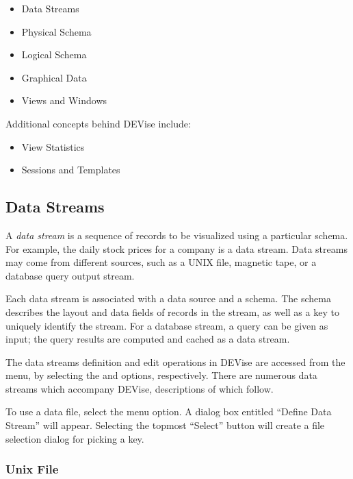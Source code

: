 \begin{itemize}
	\item Data Streams
	\item Physical Schema
	\item Logical Schema
	\item Graphical Data
	\item Views and Windows
\end{itemize}

Additional concepts behind DEVise include:

\begin{itemize}
	\item View Statistics
	\item Sessions and Templates
\end{itemize}


\subsection{Data Streams}

A {\em data stream} is a sequence of records to be visualized using a particular
schema. For example, the daily stock prices for a company is a data stream. Data
streams may come from different sources, such as a UNIX file, magnetic tape, or
a database query output stream.

Each data stream is associated with a data source and a schema. The schema
describes the layout and data fields of records in the stream, as well as a key
to uniquely identify the stream. For a database stream, a query can
be given as input; the query results are computed and cached as a
data stream.

The data streams definition and edit operations in DEVise are accessed from the
 menu, by selecting the  and  options,
respectively. There are numerous data streams which accompany DEVise,
descriptions of which follow.

To use a data file, select the  menu option. A dialog box
entitled ``Define Data Stream'' will appear. Selecting the topmost ``Select''
button will create a file selection dialog for picking a key.

\subsubsection{Unix File}

